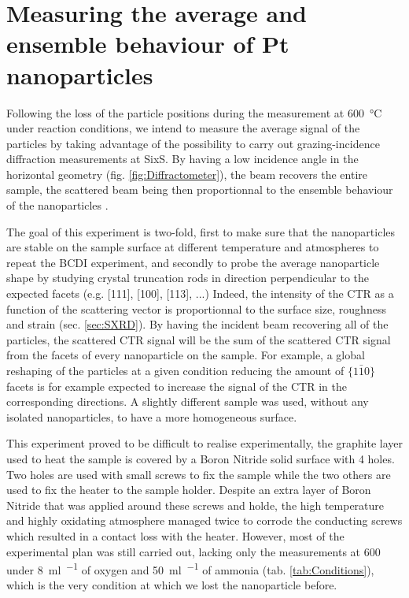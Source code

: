 \section{Measuring the average and ensemble behaviour of Pt nanoparticles}

Following the loss of the particle positions during the measurement at \qty{600}{\degreeCelsius} under reaction conditions, we intend to measure the average signal of the particles by taking advantage of the possibility to carry out grazing-incidence diffraction measurements at SixS.
By having a low incidence angle in the horizontal geometry (fig. \ref{fig:Diffractometer}), the beam recovers the entire sample, the scattered beam being then proportionnal to the ensemble behaviour of the nanoparticles \parencite{Hejral2013}.

The goal of this experiment is two-fold, first to make sure that the nanoparticles are stable on the sample surface at different temperature and atmospheres to repeat the BCDI experiment, and secondly to probe the average nanoparticle shape by studying crystal truncation rods in direction perpendicular to the expected facets (e.g. [111], [100], [113], ...)
Indeed, the intensity of the CTR as a function of the scattering vector is proportionnal to the surface size, roughness and strain (sec. \ref{sec:SXRD}).
By having the incident beam recovering all of the particles, the scattered CTR signal will be the sum of the scattered CTR signal from the facets of every nanoparticle on the sample.
For example, a global reshaping of the particles at a given condition reducing the amount of $\{1\bar{1}0\}$ facets is for example expected to increase the signal of the CTR in the corresponding directions.
A slightly different sample was used, without any isolated nanoparticles, to have a more homogeneous surface.

This experiment proved to be difficult to realise experimentally, the graphite layer used to heat the sample is covered by a Boron Nitride solid surface with 4 holes.
Two holes are used with small screws to fix the sample while the two others are used to fix the heater to the sample holder.
Despite an extra layer of Boron Nitride that was applied around these screws and holde, the high temperature and highly oxidating atmosphere managed twice to corrode the conducting screws which resulted in a contact loss with the heater.
However, most of the experimental plan was still carried out, lacking only the measurements at \qty{600}{\degreeCelcius} under \qty{8}{\ml\per\min} of oxygen and \qty{50}{\ml\per\min} of ammonia (tab. \ref{tab:Conditions}), which is the very condition at which we lost the nanoparticle before.

